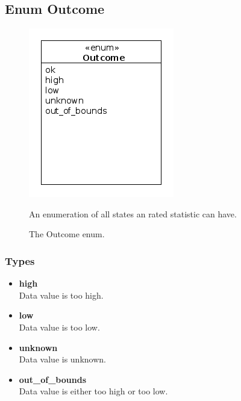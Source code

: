 \subsection{Enum Outcome}
\begin{figure}[htbp]
	\begin{minipage}[t]{8cm}
		\vspace{0pt}
		\centering
		\includegraphics[scale=0.6]{./diagram_pictures/reactor/Outcome.png}
		\caption{The Outcome enum.}
	\end{minipage}
	\hfill
	\begin{minipage}[t]{8cm}
		\vspace{10pt}
			An enumeration of all states an rated statistic can have.
	\end{minipage}
\end{figure}  

\subsubsection{Types}
\begin{itemize}
	\item \textbf{ high }\\
	Data value is too high.
	\item \textbf{ low }\\
	Data value is too low.
	\item \textbf{ unknown }\\
	Data value is unknown.
	\item \textbf{ out\_of\_bounds }\\
	Data value is either too high or too low.
\end{itemize}


\newpage
